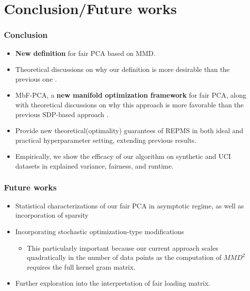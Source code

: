 \documentclass{beamer}
\begin{document}

\section{Conclusion/Future works}

\begin{frame}
	\frametitle{Conclusion}
	\begin{itemize}
		\item {\bf New definition} for fair PCA based on MMD.
		
		\item Theoretical discussions on why our definition is more desirable than the previous one \cite{OA19}.
		
		\item MbF-PCA, a {\bf new manifold optimization framework} for fair PCA, along with theoretical discussions on why this approach is more favorable than the previous SDP-based approach \cite{OA19}.
		
		\item Provide new theoretical(optimality) guarantees of REPMS in both ideal and practical hyperparameter setting, extending previous results.
		
		\item Empirically, we show the efficacy of our algorithm on synthetic and UCI datasets in explained variance, fairness, and runtime.
	\end{itemize}
\end{frame}

\begin{frame}
	\frametitle{Future works}
	\begin{itemize}
		\item Statistical characterizations of our fair PCA in asymptotic regime, as well as incorporation of sparsity \cite{JL09}
		
		\item Incorporating stochastic optimization-type modifications \cite{Shamir15, fairbatch}
		\begin{itemize}
			\item This particularly important because our current approach scales quadratically in the number of data points as the computation of $MMD^2$ requires the full kernel gram matrix.
		\end{itemize}
	
		\item Further exploration into the interpretation of fair loading matrix.
	\end{itemize}
\end{frame}
\end{document}
